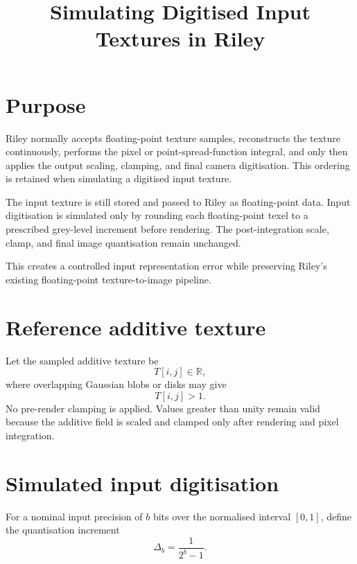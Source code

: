 \documentclass[11pt,a4paper]{article}
\title{Simulating Digitised Input Textures in Riley}
\author{}
\date{}
\begin{document}
\maketitle

\section{Purpose}

Riley normally accepts floating-point texture samples, reconstructs the texture continuously, performs the pixel or point-spread-function integral, and only then applies the output scaling, clamping, and final camera digitisation. This ordering is retained when simulating a digitised input texture.

The input texture is still stored and passed to Riley as floating-point data. Input digitisation is simulated only by rounding each floating-point texel to a prescribed grey-level increment before rendering. The post-integration scale, clamp, and final image quantisation remain unchanged.

This creates a controlled input representation error while preserving Riley's existing floating-point texture-to-image pipeline.

\section{Reference additive texture}

Let the sampled additive texture be
\begin{equation}
    T[i,j] \in \mathbb{R},
\end{equation}
where overlapping Gaussian blobs or disks may give
\begin{equation}
    T[i,j] > 1.
\end{equation}
No pre-render clamping is applied. Values greater than unity remain valid because the additive field is scaled and clamped only after rendering and pixel integration.

\section{Simulated input digitisation}

For a nominal input precision of $b$ bits over the normalised interval $[0,1]$, define the quantisation increment
\begin{equation}
    \Delta_b = \frac{1}{2^b-1}.
\end{equation}
\end{document}
